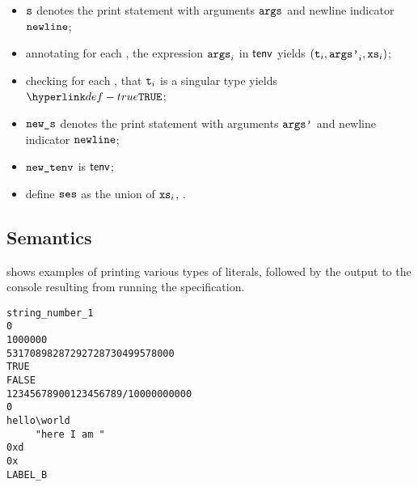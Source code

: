 \ProseParagraph
\AllApply
\begin{itemize}
  \item $\vs$ denotes the print statement with arguments $\vargs$ and newline indicator $\vnewline$;
  \item annotating for each , the expression $\vargs_i$ in $\tenv$ yields $(\vt_i, \vargsp_i, \vxs_i)$\ProseOrTypeError;
  \item checking for each , that $\vt_i$ is a singular type yields $\True$\ProseOrTypeError;
  \item $\news$ denotes the print statement with arguments $\vargsp$ and newline indicator $\vnewline$;
  \item $\newtenv$ is $\tenv$;
  \item define $\vses$ as the union of $\vxs_i$, .
\end{itemize}

\FormallyParagraph
\begin{mathpar}
\end{mathpar}

\subsection{Semantics}

 shows examples of printing various types of literals,
followed by the output to the console resulting from running the specification.
\begin{Verbatim}[fontsize=\footnotesize, frame=single]
string_number_1
0
1000000
53170898287292728730499578000
TRUE
FALSE
12345678900123456789/10000000000
0
hello\world
	 "here I am "
0xd
0x
LABEL_B
\end{Verbatim}


